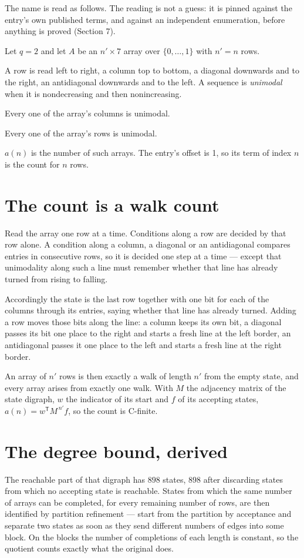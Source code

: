 \documentclass[11pt]{article}
\theoremstyle{definition}
\begin{document}
The name is read as follows. The reading is not a guess: it is pinned against the entry's own published terms, and against an independent enumeration, before anything is proved (Section 7).

Let $q = 2$ and let $A$ be an $n' \times 7$ array over $\{0,\dots,1\}$ with $n' = n$ rows.

A row is read left to right, a column top to bottom, a diagonal downwards and to the right, an antidiagonal downwards and to the left. A sequence is {\itshape unimodal} when it is nondecreasing and then nonincreasing.

Every one of the array's columns is unimodal.

Every one of the array's rows is unimodal.

$a(n)$ is the number of such arrays. The entry's offset is 1, so its term of index $n$ is the count for $n$ rows.

\section{The count is a walk count}

Read the array one row at a time. Conditions along a row are decided by that row alone. A condition along a column, a diagonal or an antidiagonal compares entries in consecutive rows, so it is decided one step at a time --- except that unimodality along such a line must remember whether that line has already turned from rising to falling.

Accordingly the state is the last row together with one bit for each of the columns through its entries, saying whether that line has already turned. Adding a row moves those bits along the line: a column keeps its own bit, a diagonal passes its bit one place to the right and starts a fresh line at the left border, an antidiagonal passes it one place to the left and starts a fresh line at the right border.

An array of $n'$ rows is then exactly a walk of length $n'$ from the empty state, and every array arises from exactly one walk. With $M$ the adjacency matrix of the state digraph, $w$ the indicator of its start and $f$ of its accepting states, $a(n) = w^{\mathsf T}M^{\,n'}f$, so the count is C-finite.

\section{The degree bound, derived}

The reachable part of that digraph has $898$ states, $898$ after discarding states from which no accepting state is reachable. States from which the same number of arrays can be completed, for every remaining number of rows, are then identified by partition refinement --- start from the partition by acceptance and separate two states as soon as they send different numbers of edges into some block. On the blocks the number of completions of each length is constant, so the quotient counts exactly what the original does.
\end{document}
